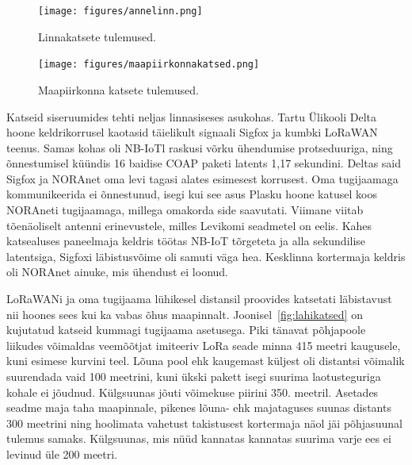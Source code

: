 \documentclass[12pt]{article}
\begin{document}
    \begin{figure} [p]
        \begin{center}
            \vspace*{-0.5cm}
            \texttt{[image: figures/annelinn.png]}
            \caption{Linnakatsete tulemused.}
            \label{fig:annelinn}
        \end{center}
    \end{figure}

    \begin{figure} [p]
        \begin{center}
            \vspace*{-0.5cm}
            \texttt{[image: figures/maapiirkonnakatsed.png]}
            \caption{Maapiirkonna katsete tulemused.}
            \label{fig:maapiirkonnakatsed}
        \end{center}
    \end{figure}

    Katseid siseruumides tehti neljas linnasiseses asukohas.
    Tartu Ülikooli Delta hoone keldrikorrusel kaotasid täielikult signaali Sigfox ja kumbki LoRaWAN teenus.
    Samas kohas oli NB-IoTl raskusi võrku ühendumise protseduuriga, ning õnnestumisel küündis 16 baidise COAP paketi latents 1,17 sekundini.
    Deltas said Sigfox ja NORAnet oma levi tagasi alates esimesest korrusest.
    Oma tugijaamaga kommunikeerida ei õnnestunud, isegi kui see asus Plasku hoone katusel koos NORAneti tugijaamaga, millega omakorda side saavutati.
    Viimane viitab tõenäoliselt antenni erinevustele, milles Levikomi seadmetel on eelis.
    Kahes katsealuses paneelmaja keldris töötas NB-IoT tõrgeteta ja alla sekundilise latentsiga, Sigfoxi läbistusvõime oli samuti väga hea.
    Kesklinna kortermaja keldris oli NORAnet ainuke, mis ühendust ei loonud.

    LoRaWANi ja oma tugijaama lühikesel distansil proovides katsetati läbistavust nii hoones sees kui ka vabas õhus maapinnalt.
    Joonisel~\ref{fig:lahikatsed} on kujutatud katseid kummagi tugijaama asetusega.
    Piki tänavat põhjapoole liikudes võimaldas veemõõtjat imiteeriv LoRa seade minna 415 meetri kaugusele, kuni esimese kurvini teel.
    Lõuna pool ehk kaugemast küljest oli distantsi võimalik suurendada vaid 100 meetrini, kuni ükski pakett isegi suurima laotusteguriga kohale ei jõudnud.
    Külgsuunas jõuti võimekuse piirini 350. meetril.
    Asetades seadme maja taha maapinnale, pikenes lõuna- ehk majataguses suunas distants 300 meetrini ning hoolimata vahetust takistusest kortermaja näol jäi põhjasuunal tulemus samaks.
    Külgsuunas, mis nüüd kannatas kannatas suurima varje ees ei levinud üle 200 meetri.
\end{document}
